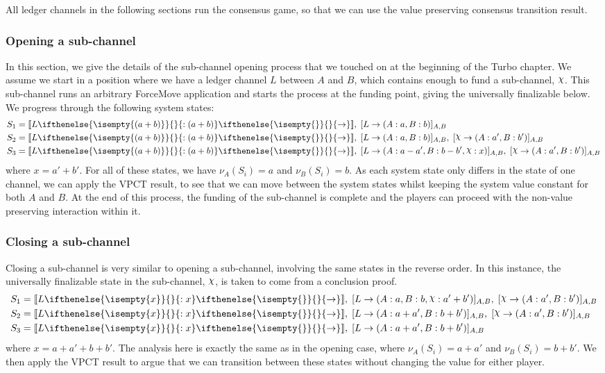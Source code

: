 \documentclass{article}
\DeclareRobustCommand{\rchi}{{\mathpalette\irchi\relax}}
\newcommand{\irchi}[2]{\raisebox{\depth}{$#1\chi$}} %
\theoremstyle{definition}
\newcommand{\adj}[1]{\llbracket #1 \rrbracket}
\newcommand{\holds}[3]{#1 %
  \ifthenelse{\isempty{#2}}{}{: #2} %
  \ifthenelse{\isempty{#3}}{}{\rightarrow #3} %
}
\newcommand{\alloc}[1]{( #1 )}
\newcommand{\finalizable}[3]{[#1 \rightarrow #2]_{#3}}
\begin{document}
All ledger channels in the following sections run the consensus game, so that we can use the value preserving consensus transition result.

\subsubsection{Opening a sub-channel}

In this section, we give the details of the sub-channel opening process that we touched on at the beginning of the Turbo chapter.
We assume we start in a position where we have a ledger channel $L$ between $A$ and $B$, which contains enough to fund a sub-channel, $\rchi$.
This sub-channel runs an arbitrary ForceMove application and starts the process at the funding point, giving the universally finalizable below.
We progress through the following system states:
\begin{align*}
  S_1 &= \adj{\holds{L}{(a+b)}{}},\; \finalizable{L}{\alloc{A:a, B:b}}{A,B}\\
  S_2 &= \adj{\holds{L}{(a+b)}{}},\; \finalizable{L}{\alloc{A:a, B:b}}{A,B},\;  \finalizable{\rchi}{\alloc{A: a', B: b'}}{A,B} \\
  S_3 &= \adj{\holds{L}{(a+b)}{}},\; \finalizable{L}{\alloc{A: a-a', B: b-b', \rchi: x }}{A,B},\; \finalizable{\rchi}{\alloc{A: a', B: b' }}{A, B}
\end{align*}
where $x = a' + b'$.
For all of these states, we have $\nu_A(S_i) = a$ and $\nu_B(S_i) = b$.
As each system state only differs in the state of one channel, we can apply the VPCT result, to see that we can move between the system states whilst keeping the system value constant for both $A$ and $B$.
At the end of this process, the funding of the sub-channel is complete and the players can proceed with the non-value preserving interaction within it.

\subsubsection{Closing a sub-channel}

Closing a sub-channel is very similar to opening a sub-channel, involving the same states in the reverse order.
In this instance, the universally finalizable state in the sub-channel, $\rchi$, is
taken to come from a conclusion proof.
\begin{align*}
S_1 &= \adj{\holds{L}{x}{}},\; \finalizable{L}{\alloc{A: a, B: b, \rchi: a' + b'}}{A, B}, \; \finalizable{\rchi}{\alloc{A: a', B: b'}}{A, B} \\
S_2 &= \adj{\holds{L}{x}{}}, \; \finalizable{L}{\alloc{A: a + a', B: b + b'}}{A, B}, \; \finalizable{\rchi}{\alloc{A: a', B: b'}}{A, B} \\
S_3 &= \adj{\holds{L}{x}{}}, \; \finalizable{L}{\alloc{A: a + a', B: b + b'}}{A, B}
\end{align*}
where $x = a + a' + b + b'$.
The analysis here is exactly the same as in the opening case, where $\nu_A(S_i) = a + a'$ and $\nu_B(S_i) = b + b'$.
We then apply the VPCT result to argue that we can transition between these states without changing the value for either player.
\end{document}
